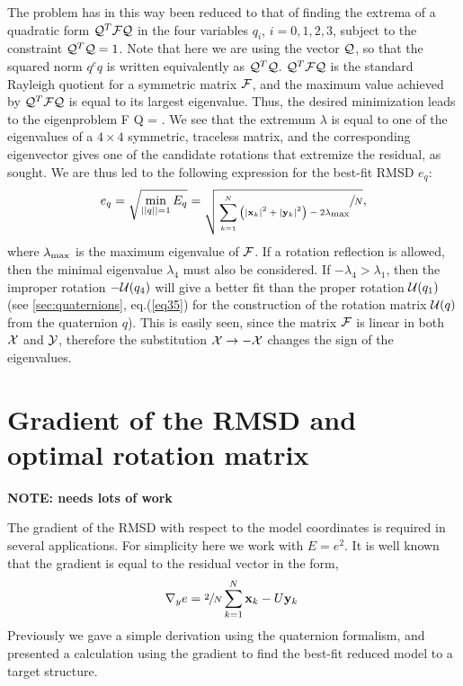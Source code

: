 \documentclass[9pt,lineno]{elife}
\begin{document}
The problem has in this way been reduced to that of finding the extrema
of a quadratic form ${\cal Q}^T {\cal F} {\cal Q}$ in the four variables 
$q_i$, $i = 0,1,2,3$, subject to the constraint ${\cal Q}^T {\cal Q} =1$. 
Note that here we are using the vector ${\cal Q}$, so that the squared norm
$q^cq$ is written equivalently as ${\cal Q}^T{\cal Q}$. 
${\cal Q}^T {\cal F} {\cal Q}$ is the standard Rayleigh quotient 
for a symmetric matrix ${\cal F}$, 
and the maximum value achieved by ${\cal Q}^T {\cal F} {\cal Q}$ is 
equal to its largest eigenvalue. 
Thus, the desired minimization leads to the eigenproblem
\be
{\cal F} {\cal Q} = .
\label{eig}
\ee
We see that the extremum $\lambda$ is equal to one of the 
eigenvalues of a
$4\times 4$ symmetric, traceless matrix, and the corresponding eigenvector
gives one of the candidate rotations that extremize the residual, as
sought. 
We are thus led to the following expression for the best-fit RMSD $e_q$:
\[ 
e_q = \sqrt{\min_{||q||=1} E_q} = 
\sqrt{
\sfrac{\sum_{k=1}^N
\left( |{\bf x}_k|^2 + |{\bf y}_k|^2 \right) - 
2 \lambda_{\mbox{\scriptsize{max}}}}{N}},
\] 
where $\lambda_{\mbox{\scriptsize{max}}}$ is the maximum eigenvalue of
$\cal F$. If a rotation reflection is allowed, then the minimal eigenvalue
$\lambda_4$ must also be considered. If $-\lambda_4 > \lambda_1$, then
the improper rotation $-{\cal U}(q_4)$ will give a better fit than the
proper rotation ${\cal U}(q_1)$ (see \ref{sec:quaternions}, 
eq.(\ref{eq35}) for the
construction of the rotation matrix ${\cal U}(q)$ from the quaternion $q$). 
This is easily seen, since the matrix
${\cal F}$ is linear in both ${\cal X}$ and ${\cal Y}$, therefore
the substitution ${\cal X} \rightarrow -{\cal X}$ changes the sign of the
eigenvalues. 
%
\section{Gradient of the RMSD and optimal rotation matrix}
\label{sec:grad}
{\bf NOTE: needs lots of work}

The gradient of the RMSD with respect to the model coordinates is required
in several applications. For simplicity here we work with $E= e ^2$. 
It is well known \cite{brooks1} that the gradient
is equal to the residual vector in the form,
\begin{equation}
\label{eq:grad-charmm}
 \nabla_y {e} = \sfrac{2}{N}\sum_{k=1}^N {\bf x}_k - U {\bf y}_k \ 
\end{equation}
Previously \cite{Coutsias2003} we gave
a simple derivation using the quaternion formalism,
and presented a calculation
using the gradient to find the best-fit reduced model
to a target structure.
\end{document}
